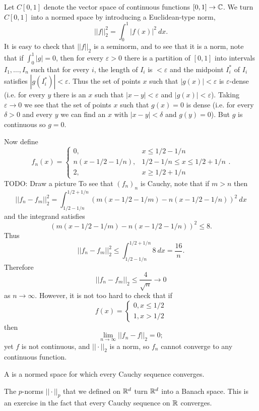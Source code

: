 \begin{example}
Let $C[0, 1]$ denote the vector space of continuous functions $[0, 1] \to \mathbb{C}$.
We turn $C[0, 1]$ into a normed space by introducing a Euclidean-type norm,
$$||f||_2^2 = \int_0^1 |f(x)|^2 ~dx.$$
It is easy to check that $||f||_2$ is a seminorm, and to see that it is a norm, note that if $\int_0^1 |g| = 0$, then for every $\varepsilon > 0$ there is a partition of $[0, 1]$ into intervals $I_1, \dots, I_n$ such that for every $i$, the length of $I_i$ is $<\varepsilon$ and the midpoint $I_i^*$ of $I_i$ satisfies $|g(I_i^*)| < \varepsilon$.
Thus the set of points $x$ such that $|g(x)| < \varepsilon$ is $\varepsilon$-dense (i.e. for every $y$ there is an $x$ such that $|x - y| < \varepsilon$ and $|g(x)| < \varepsilon$).
Taking $\varepsilon \to 0$ we see that the set of points $x$ such that $g(x) = 0$ is dense (i.e. for every $\delta > 0$ and every $y$ we can find an $x$ with $|x - y| < \delta$ and $g(y) = 0$).
But $g$ is continuous so $g = 0$.

Now define
$$f_n(x) = \begin{cases}
0, &x \leq 1/2 - 1/n\\
n(x - 1/2 - 1/n), &1/2 - 1/n \leq x \leq 1/2 + 1/n\\
2, &x \geq 1/2 + 1/n
\end{cases}.$$
TODO: Draw a picture
To see that $(f_n)_n$ is Cauchy, note that if $m > n$ then
$$||f_n - f_m||_2^2 = \int_{1/2-1/n}^{1/2+1/n} (m(x - 1/2 - 1/m) - n(x - 1/2 - 1/n))^2~dx$$
and the integrand satisfies
$$(m(x - 1/2 - 1/m) - n(x - 1/2 - 1/n))^2 \leq 8.$$
Thus
$$||f_n - f_m||_2^2 \leq \int_{1/2-1/n}^{1/2+1/n} 8~dx = \frac{16}{n}.$$
Therefore
$$||f_n - f_m||_2 \leq \frac{4}{\sqrt n} \to 0$$
as $n \to \infty$. However, it is not too hard to check that if
$$f(x) = \begin{cases}
0, x \leq 1/2\\
1, x > 1/2
\end{cases}$$
then
$$\lim_{n \to \infty} ||f_n - f||_2 = 0;$$
yet $f$ is not continuous, and $||\cdot||_2$ is a norm, so $f_n$ cannot converge to any continuous function.
\end{example}

\begin{definition}
A  is a normed space for which every Cauchy sequence converges.
\end{definition}

\begin{example}
The $p$-norms $||\cdot||_p$ that we defined on $\mathbb{R}^d$ turn $\mathbb{R}^d$ into a Banach space.
This is an exercise in the fact that every Cauchy sequence on $\mathbb{R}$ converges.
\end{example}

